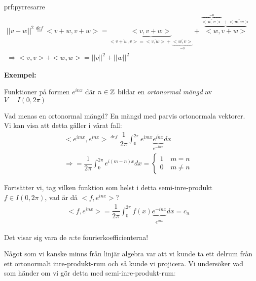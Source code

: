\par\bigskip
\begin{prf}{prf:pyrresarre}
  \begin{equation*}
    \begin{gathered}
      \left|\left|v+w\right|\right|^2 \stackrel{def}{=} <v+w,v+w> = \underbrace{<v,v+w>}_{\text{$\overline{<v+w,v>} = \overline{<v,w>}+\underbrace{\overline{<w,v>}}_{\text{=0}}$}}+\overbrace{<w,v+w>}^{\text{$\overbrace{\overline{<w,v>}}^{\text{=0}}+\overline{<w,w>}$}}\\
      \Rightarrow <v,v>+<w,w> = \left|\left|v\right|\right|^2+\left|\left|w\right|\right|^2
    \end{gathered}
  \end{equation*}
\end{prf}
\par\bigskip
\noindent\textbf{Exempel:}\par
\noindent Funktioner på formen $e^{inx}$ där $n\in\mathbb{Z}$ bildar en \textit{ortonormal mängd} av $V = I(0,2\pi)$\par
\noindent Vad menas en ortonormal mängd? En mängd med parvis ortonormala vektorer. Vi kan visa att detta gäller i vårat fall:
\begin{equation*}
  \begin{gathered}
    <e^{imx},e^{inx}> \stackrel{def}{=} \dfrac{1}{2\pi}\int_{0}^{2\pi}e^{imx}\underbrace{\overline{e^{inx}}}_{\text{$e^{-inx}$}}dx\\
    \Rightarrow = \dfrac{1}{2\pi}\int_{0}^{2\pi}e^{i(m-n)x}dx = \begin{cases}1\quad m=n\\0\quad m\neq n\end{cases}
  \end{gathered}
\end{equation*}\par
\noindent Fortsätter vi, tag vilken funktion som helst i detta semi-inre-produkt $f\in I(0,2\pi)$, vad är då $<f,e^{inx}>$?
\begin{equation*}
  \begin{gathered}
    <f,e^{inx}> = \dfrac{1}{2\pi}\int_{0}^{2\pi}f(x)\underbrace{e^{-inx}}_{\text{$\overline{e^{inx}}$}}dx = c_n
  \end{gathered}
\end{equation*}\par
\noindent Det visar sig vara de $n$:te fourierkoefficienterna! 
\par\bigskip
\noindent Något som vi kanske minns från linjär algebra var att vi kunde ta ett delrum från ett ortonormalt inre-produkt-rum och så kunde vi projicera. Vi undersöker vad som händer om vi gör detta med semi-inre-produkt-rum:
